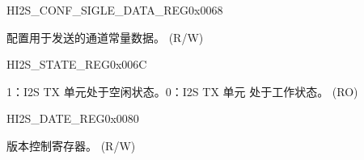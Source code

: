 \begin{register}{H}{I2S\_CONF\_SIGLE\_DATA\_REG}{0x{}0068}\label{regdesc:I2SCONFSIGLEDATAREG}
%
\regnewline%
\begin{regdesc}\begin{reglist}
\label{fielddesc:I2SSINGLEDATA}\item [I2S\_SINGLE\_DATA] 配置用于发送的通道常量数据。 (R/W)
\end{reglist}\end{regdesc}
\end{register}


\begin{register}{H}{I2S\_STATE\_REG}{0x{}006C}\label{regdesc:I2SSTATEREG}
%
%
\regnewline%
\begin{regdesc}\begin{reglist}
\label{fielddesc:I2STXIDLE}\item [I2S\_TX\_IDLE] 1：I2S TX 单元处于空闲状态。0：I2S TX 单元 处于工作状态。 (RO)
\end{reglist}\end{regdesc}
\end{register}


\begin{register}{H}{I2S\_DATE\_REG}{0x{}0080}\label{regdesc:I2SDATEREG}
%
%
\regnewline%
\begin{regdesc}\begin{reglist}
\label{fielddesc:I2SDATE}\item [I2S\_DATE] 版本控制寄存器。 (R/W)
\end{reglist}\end{regdesc}
\end{register}


